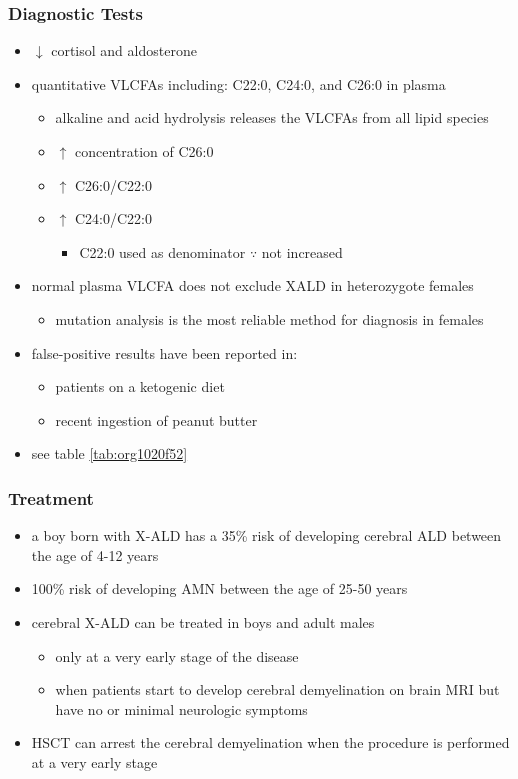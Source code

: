 \documentclass[12pt]{scrartcl}
\begin{document}
\subsubsection{Diagnostic Tests}
\label{sec:org5de5763}
\begin{itemize}
\item \(\downarrow\) cortisol and aldosterone
\item quantitative VLCFAs including: C22:0, C24:0, and C26:0 in plasma
\begin{itemize}
\item alkaline and acid hydrolysis releases the VLCFAs from all lipid
species
\item \(\uparrow\) concentration of C26:0
\item \(\uparrow\) C26:0/C22:0
\item \(\uparrow\) C24:0/C22:0
\begin{itemize}
\item C22:0 used as denominator \(\because\) not increased
\end{itemize}
\end{itemize}
\item normal plasma VLCFA does not exclude XALD in heterozygote females
\begin{itemize}
\item mutation analysis is the most reliable method for diagnosis in females
\end{itemize}
\item false-positive results have been reported in:
\begin{itemize}
\item patients on a ketogenic diet
\item recent ingestion of peanut butter
\end{itemize}
\item see table \ref{tab:org1020f52}
\end{itemize}
\subsubsection{Treatment}
\label{sec:orgd86d0c3}
\begin{itemize}
\item a boy born with X-ALD has a 35\% risk of developing cerebral ALD
between the age of 4-12 years
\item 100\% risk of developing AMN between the age of 25-50 years
\item cerebral X-ALD can be treated in boys and adult males
\begin{itemize}
\item only at a very early stage of the disease
\item when patients start to develop cerebral demyelination on brain MRI
but have no or minimal neurologic symptoms
\end{itemize}
\item HSCT can arrest the cerebral demyelination when the procedure is
performed at a very early stage
\end{itemize}
\end{document}
